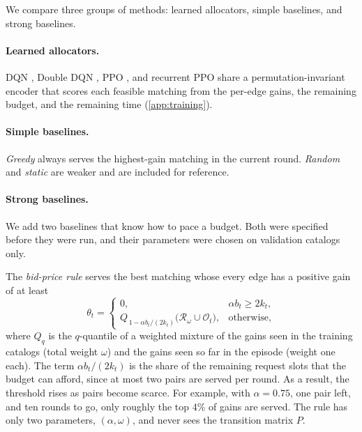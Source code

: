 \documentclass[10pt]{article}
\begin{document}
We compare three groups of methods: learned allocators, simple baselines, and strong baselines.

\paragraph{Learned allocators.} DQN \citep{mnih2015human}, Double DQN \citep{vanhasselt2016deep}, PPO \citep{schulman2017proximal}, and recurrent PPO share a permutation-invariant encoder that scores each feasible matching from the per-edge gains, the remaining budget, and the remaining time (\cref{app:training}).

\paragraph{Simple baselines.} \emph{Greedy} always serves the highest-gain matching in the current round. \emph{Random} and \emph{static} are weaker and are included for reference.

\paragraph{Strong baselines.} We add two baselines that know how to pace a budget. Both were specified before they were run, and their parameters were chosen on validation catalogs only.

The \emph{bid-price rule} serves the best matching whose every edge has a positive gain of at least
\begin{equation}
  \theta_t=\begin{cases}0, & \alpha b_t\ge 2k_t,\\ Q_{\,1-\alpha b_t/(2k_t)}\bigl(\mathcal R_\omega\cup\mathcal O_t\bigr), & \text{otherwise,}\end{cases}
  \label{eq:bidprice}
\end{equation}
where $Q_q$ is the $q$-quantile of a weighted mixture of the gains seen in the training catalogs (total weight $\omega$) and the gains seen so far in the episode (weight one each). The term $\alpha b_t/(2k_t)$ is the share of the remaining request slots that the budget can afford, since at most two pairs are served per round. As a result, the threshold rises as pairs become scarce. For example, with $\alpha=0.75$, one pair left, and ten rounds to go, only roughly the top 4\% of gains are served. The rule has only two parameters, $(\alpha,\omega)$, and never sees the transition matrix $P$.
\end{document}
